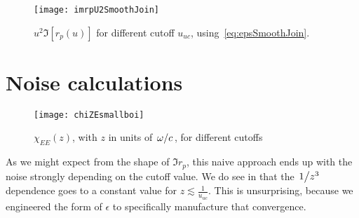 \documentclass[11pt]{article}
\begin{document}
	\begin{figure}[htp]
		\centering
		\texttt{[image: imrpU2SmoothJoin]}
		\caption{$u^2 \Im[r_p(u)]$ for different cutoff $u_{uc}$, using~\eqref{eq:epsSmoothJoin}.} \label{fig:u2imrpVsCutoffSmoothJoin}
	\end{figure}

	\section{Noise calculations} \label{sec:noise}
	\begin{figure}[htp]
		\centering
		\texttt{[image: chiZEsmallboi]}
		\caption{$\chi_{EE}(z)$, with $z$ in units of $\flatfrac{\omega}{c}$, for different cutoffs} \label{fig:chiZRange}
	\end{figure}
	As we might expect from the shape of $\Im r_p$, this naive approach ends up with the noise strongly depending on the cutoff value.
	We do see in  that the $\flatfrac{1}{z^3}$ dependence goes to a constant value for $z \lesssim \frac{1}{u_{uc}}$.
	This is unsurprising, because we engineered the form of $\epsilon$ to specifically manufacture that convergence.



	\newpage
	\listoftodos
	\newpage
	\printbibliography
\end{document}
